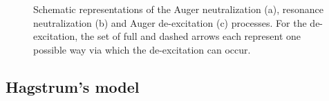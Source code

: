 \begin{refsection}
{
\begin{figure}[ht] 
    \centering 
    \begin{subfigure}[t]{0.3\textwidth} 
        \centering 
        
        \caption{} 
    \end{subfigure}%
    ~ \hspace{1em} 
    \begin{subfigure}[t]{0.3\textwidth} 
        \centering 
        
        \caption{} 
    \end{subfigure} 
    ~ \hspace{1em} 
    \begin{subfigure}[t]{0.3\textwidth} 
        \centering 
        
        \caption{} 
    \end{subfigure}%
    \caption{\label{quotas:fig-auger}Schematic representations of the Auger 
neutralization (a), resonance neutralization (b) and Auger de-excitation (c) 
processes. For the de-excitation, the set of full and dashed arrows each 
represent one possible way via which the de-excitation can occur.} 
\end{figure} 
}

\subsection{Hagstrum's model} \label{quotas:sec-hagstrum} 
 

\end{refsection}
